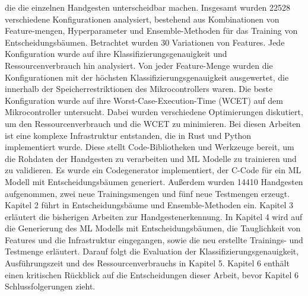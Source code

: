die die einzelnen Handgesten unterscheidbar machen.
\newline
\newline
Insgesamt wurden 22528 verschiedene Konfigurationen analysiert, bestehend aus Kombinationen von Feature-mengen, Hyperparameter und Ensemble-Methoden für das Training von Entscheidungsbäumen.
Betrachtet wurden 30 Variationen von Features. Jede Konfiguration wurde auf ihre Klassifizierungsgenauigkeit und Ressourcenverbrauch
hin analysiert. Von jeder Feature-Menge wurden die Konfigurationen mit der höchsten Klassifizierungsgenauigkeit ausgewertet, die innerhalb der Speicherrestriktionen des Mikrocontrollers waren. Die beste
Konfiguration wurde auf ihre Worst-Case-Execution-Time (WCET) auf dem Mikrocontroller untersucht. Dabei wurden verschiedene Optimierungen diskutiert, um den Ressourcenverbrauch und die WCET zu minimieren.
Bei diesen Arbeiten ist eine komplexe Infrastruktur entstanden, die in Rust und Python implementiert wurde. Diese stellt Code-Bibliotheken und Werkzeuge bereit, um die Rohdaten der Handgesten zu verarbeiten und
ML Modelle zu trainieren und zu validieren. Es wurde ein Codegenerator implementiert, der C-Code für ein ML Modell mit Entscheidungsbäumen generiert. Außerdem wurden 14410 Handgesten aufgenommen,
zwei neue Trainingsmengen und fünf neue Testmengen erzeugt.
\newline
\newline
Kapitel 2 führt in Entscheidungsbäume und Ensemble-Methoden ein. Kapitel 3 erläutert die bisherigen Arbeiten zur Handgestenerkennung. In Kapitel 4 wird auf die Generierung des ML Modells mit Entscheidungsbäumen,
die Tauglichkeit von Features und die Infrastruktur eingegangen, sowie die neu erstellte Trainings- und Testmenge erläutert. Darauf folgt die Evaluation der Klassifizierungsgenauigkeit, Ausführungszeit
und des Ressourcenverbrauchs in Kapitel 5. Kapitel 6 enthält einen kritischen Rückblick auf die Entscheidungen dieser Arbeit, bevor Kapitel 6 Schlussfolgerungen zieht.